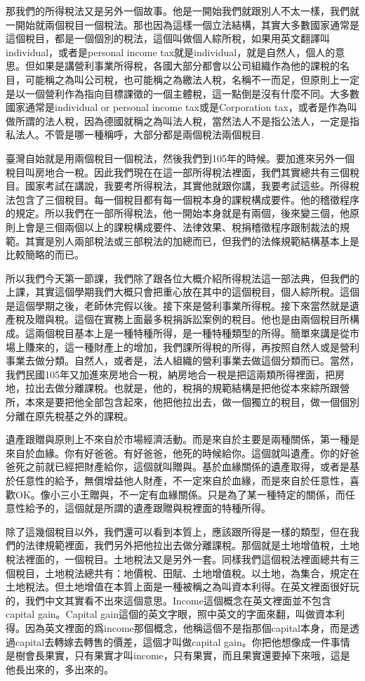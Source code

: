 \documentclass[oneside,sub3section]{ctexbook}
\begin{document}
那我們的所得稅法又是另外一個故事。他是一開始我們就跟別人不太一樣，我們就一開始就兩個稅目一個稅法。那也因為這樣一個立法結構，其實大多數國家通常是這個稅目，都是一個個別的稅法，這個叫做個人綜所稅，如果用英文翻譯叫individual，或者是personal income tax就是individual，就是自然人，個人的意思。但如果是講營利事業所得稅，各國大部分都會以公司組織作為他的課稅的名目，可能稱之為叫公司稅，也可能稱之為繳法人稅，名稱不一而足，但原則上一定是以一個營利作為指向目標課徵的一個主體稅，這一點倒是沒有什麼不同。大多數國家通常是individual or personal income tax或是Corporation tax，或者是作為叫做所謂的法人稅，因為德國就稱之為叫法人稅，當然法人不是指公法人，一定是指私法人。不管是哪一種稱呼，大部分都是兩個稅法兩個稅目.

臺灣自始就是用兩個稅目一個稅法，然後我們到105年的時候。要加進來另外一個稅目叫房地合一稅。因此我們現在在這一部所得稅法裡面，我們其實總共有三個稅目。國家考試在講說，我要考所得稅法，其實他就跟你講，我要考試這些。所得稅法包含了三個稅目。每一個稅目都有每一個稅本身的課稅構成要件。他的稽徵程序的規定。所以我們在一部所得稅法，他一開始本身就是有兩個，後來變三個，他原則上會是三個兩個以上的課稅構成要件、法律效果、稅捐稽徵程序跟制裁法的規範。其實是別人兩部稅法或三部稅法的加總而已，但我們的法條規範結構基本上是比較簡略的而已。

所以我們今天第一節課，我們除了跟各位大概介紹所得稅法這一部法典，但我們的上課，其實這個學期我們大概只會把重心放在其中的這個稅目，個人綜所稅。這個是這個學期之後，老師休完假以後。接下來是營利事業所得稅。接下來當然就是遺產稅及贈與稅。這個在實務上面最多稅捐訴訟案例的稅目。他也是由兩個稅目所構成。這兩個稅目基本上是一種特種所得，是一種特種類型的所得。簡單來講是從市場上賺來的，這一種財產上的增加，我們課所得稅的所得，再按照自然人或是營利事業去做分類。自然人，或者是，法人組織的營利事業去做這個分類而已。當然，我們民國105年又加進來房地合一稅，納房地合一稅是把這兩類所得裡面，把房地，拉出去做分離課稅。也就是，他的，稅捐的規範結構是把他從本來綜所跟營所，本來是要把他全部包含起來，他把他拉出去，做一個獨立的稅目，做一個個別分離在原先稅基之外的課稅。

遺產跟贈與原則上不來自於市場經濟活動。而是來自於主要是兩種關係，第一種是來自於血緣。你有好爸爸。有好爸爸，他死的時候給你。這個就叫遺產。你的好爸爸死之前就已經把財產給你，這個就叫贈與。基於血緣關係的遺產取得，或者是基於任意性的給予，無償增益他人財產，不一定來自於血緣，而是來自於任意性，喜歡OK。像小三小王贈與，不一定有血緣關係。只是為了某一種特定的關係，而任意性給予的，這個就是所謂的遺產跟贈與稅裡面的特種所得。

除了這幾個稅目以外，我們還可以看到本質上，應該跟所得是一樣的類型，但在我們的法律規範裡面，我們另外把他拉出去做分離課稅。那個就是土地增值稅，土地稅法裡面的，一個稅目。土地稅法又是另外一套。同樣我們這個稅法裡面總共有三個稅目，土地稅法總共有：地價稅、田賦、土地增值稅。以土地，為集合，規定在土地稅法。但土地增值在本質上面是一種被稱之為叫資本利得。在英文裡面很好玩的，我們中文其實看不出來這個意思。Income這個概念在英文裡面並不包含capital gain。Capital gain這個的英文字眼，照中英文的字面來翻，叫做資本利得。因為英文裡面的爲income那個概念，他稱這個不是指那個capital本身，而是透過capital去轉嫁去轉售的價差，這個才叫做capital gain。你把他想像成一件事情是樹會長果實，只有果實才叫income，只有果實，而且果實還要掉下來哦，這是他長出來的，多出來的。
\end{document}
